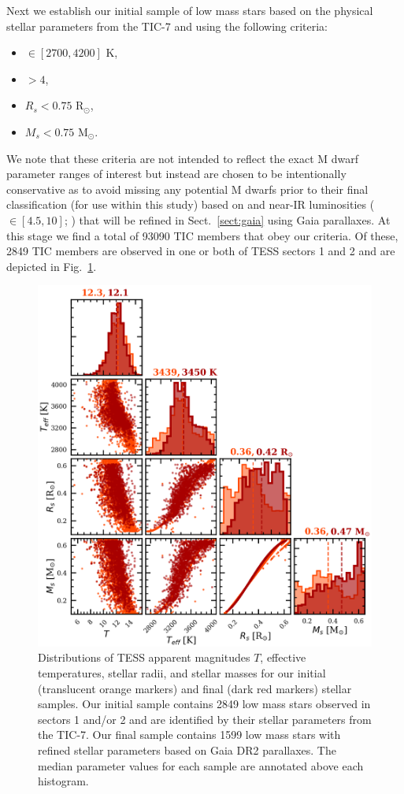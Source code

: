 Next we establish our initial sample of low mass stars based on the physical stellar parameters from the
TIC-7 and using the following criteria:

\begin{itemize}
\item \teff{} $\in [2700,4200]$ K,
\item \logg{} $>4$,
\item $R_s < 0.75$ R$_{\odot}$,
\item $M_s < 0.75$ M$_{\odot}$.
\end{itemize}

\noindent We note that these criteria are not intended to reflect the exact M dwarf parameter ranges of
interest but instead are chosen to be intentionally conservative as to avoid missing any potential
M dwarfs prior to their final classification (for use within this study) based on \teff{} and 
near-IR luminosities  (\MK{} $\in [4.5,10]$; \citealt{delfosse00, benedict16}) that will be refined
in Sect.~\ref{sect:gaia} using Gaia parallaxes.
At this stage we find a total of 93090 TIC members that obey our criteria. Of these, 2849 TIC members
are observed in one or both of TESS sectors 1 and 2 and are depicted in Fig.~\ref{fig:stars}.

\begin{figure}
  \centering
  \includegraphics[width=0.9\hsize]{figures/stellar_corner.png}
  \caption[Stellar parameters for M dwarf TICs in TESS sectors 1 and 2.]
          {Distributions of TESS apparent magnitudes $T$, effective temperatures,
    stellar radii, and stellar masses for our initial (translucent orange markers) and final
    (dark red markers) stellar samples. Our initial sample contains 2849 low mass stars observed in
    sectors 1 and/or 2 and are identified by their stellar parameters from the TIC-7. Our final sample contains
    1599 low mass stars with refined stellar parameters based on Gaia
    DR2 parallaxes. The median parameter values for each sample are annotated above each histogram.}
  \label{fig:stars}
\end{figure}
  

